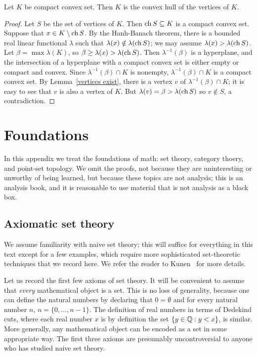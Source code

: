 \begin{theorem}
Let $K$ be compact convex set. Then $K$ is the convex hull of the vertices of $K$.
\end{theorem}
\begin{proof}
Let $S$ be the set of vertices of $K$.
Then $\operatorname{ch} S \subseteq K$ is a compact convex set.
Suppose that $x \in K \setminus \operatorname{ch} S$.
By the Hanh-Banach theorem, there is a bounded real linear functional $\lambda$ such that $\lambda(x) \notin \lambda(\operatorname{ch} S)$; we may assume $\lambda(x) > \lambda(\operatorname{ch} S)$.
Let $\beta = \max \lambda(K)$, so $\beta \geq \lambda(x) > \lambda(\operatorname{ch} S)$.
Then $\lambda^{-1}(\beta)$ is a hyperplane, and the intersection of a hyperplane with a compact convex set is either empty or compact and convex.
Since $\lambda^{-1}(\beta) \cap K$ is nonempty, $\lambda^{-1}(\beta) \cap K$ is a compact convex set.
By Lemma~\ref{vertices exist}, there is a vertex $v$ of $\lambda^{-1}(\beta) \cap K$; it is easy to see that $v$ is also a vertex of $K$.
But $\lambda(v) = \beta > \lambda(\operatorname{ch} S)$ so $v \notin S$, a contradiction.
\end{proof}


\chapter{Foundations}
In this appendix we treat the foundations of math: set theory, category thoery, and point-set topology.
We omit the proofs, not because they are uninteresting or unworthy of being learned, but because these topics are not analysis; this is an analysis book, and it is reasonable to use material that is not analysis as a black box.

\section{Axiomatic set theory}
We assume familiarity with naive set theory; this will suffice for everything in this text except for a few examples, which require more sophisticated set-theoretic techniques that we record here.
We refer the reader to Kunen~\cite{kunen2011set} for more details.

\begin{subsec}
Let us record the first few axioms of set theory.
It will be convenient to assume that \emph{every} mathematical object is a set.
This is no loss of generality, because one can define the natural numbers by declaring that $0 = \emptyset$ and for every natural number $n$, $n = \{0, \dots, n - 1\}$.
The definition of real numbers in terms of Dedekind cuts, where each real number $x$ is by definition the set $\{y \in \mathbb{Q}: y < x\}$, is similar.
More generally, any mathematical object can be encoded as a set in some appropriate way.
The first three axioms are presumably uncontroversial to anyone who has studied naive set theory.
\end{subsec}

